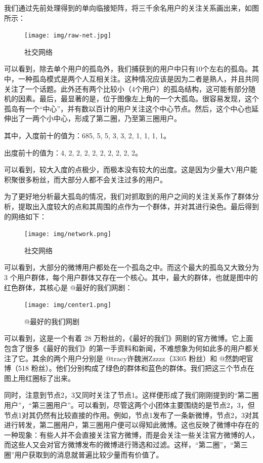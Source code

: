 \documentclass[a4paper,UTF8]{ctexart}
\begin{document}
我们通过先前处理得到的单向临接矩阵，将三千余名用户的关注关系画出来，如图所示：

\begin{figure}[htbp]
\centering
\texttt{[image: img/raw-net.jpg]}
\caption{社交网络}
\end{figure}

可以看到，除去单个用户的孤岛外，我们捕获到的用户中只有10个左右的孤岛。其中，一种孤岛模式是两个人互相关注。这种情况应该是因为二者是熟人，并且共同关注了一个话题。此外还有两个比较小（4个用户）的孤岛结构，这可能有部分随机的因素。最后，最显著的是，位于图像左上角的一个大孤岛。很容易发现，这个孤岛有一个``中心''，并有数以百计的用户关注这个中心节点。然后，这个中心也延伸出了一两个小中心，形成了第二圈，乃至第三圈用户。

其中，入度前十的值为：685, 5, 5, 3, 3, 2, 1, 1, 1, 1。

出度前十的值为：4, 2, 2, 2, 2, 2, 2, 2, 2, 2。

可以看到，较大入度的点极少，而极本没有较大的出度。这是因为少量大V用户能积聚很多粉丝，而大部分人都不会关注过多的用户。

为了更好地分析最大孤岛的情况，我们对抓取到的用户之间的关注关系作了群体分析，提取出入度较大的点和其周围的点作为一个群体，并对其进行染色。最后得到的网络如下：

\begin{figure}[htbp]
\centering
\texttt{[image: img/network.png]}
\caption{社交网络}
\end{figure}

可以看到，大部分的微博用户都处在一个孤岛之中。而这个最大的孤岛又大致分为
3
个用户群体，每个用户群体又存在一个核心。其中，最大的群体，也就是图中的红色群体，其核心是
@最好的我们网剧：

\begin{figure}[htbp]
\centering
\texttt{[image: img/center1.png]}
\caption{@最好的我们网剧}
\end{figure}

可以看到，这是一个有着 28
万粉丝的，《最好的我们》网剧的官方微博。它上面包含了很多《最好的我们》的第一手资料和新闻，不难想象为何如此多的用户都关注了它。其余的两个用户分别是
@tracy许魏洲Zzzzz（3305 粉丝）和 @然韵吧官博（518
粉丝）。他们分别构成了绿色的群体和蓝色的群体。我们把这三个节点在图上用红圈标了出来。

同时，注意到节点2，3又同时关注了节点1。这样便形成了我们刚刚提到的``第二圈用户''，``第三圈用户''。可以看到，尽管这两个小团体主要围绕的是节点2，3，但节点1对其仍然有比较直接的作用。例如，节点1发布了一条新微博，节点2，3对其进行转发，第二圈用户，第三圈用户便可以得知此微博。这也反映了微博中存在的一种现象：有些人并不会直接关注官方微博，而是会关注一些关注官方微博的人，而这些人又会对官方微博发布的微博进行筛选和过滤。这样，``第二圈''，``第三圈''用户获取到的消息就普遍比较少量而有价值了。
\end{document}
